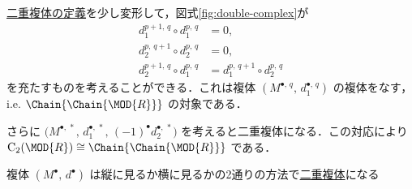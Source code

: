 \documentclass[algtopo_main]{subfiles}
\begin{document}
\begin{marker}
    \hyperref[def:double-complex]{二重複体の定義}を少し変形して，図式\ref{fig:double-complex}が
    \begin{align}
        d_1^{p+1,\, q} \circ d_1^{p,\, q} &= 0, \\
        d_2^{p,\, q+1} \circ d_2^{p,\, q} &= 0, \\
        d_2^{p+1,\, q} \circ d_1^{p,\, q} &= d_1^{p,\, q+1} \circ d_2^{p,\, q}
    \end{align}
    を充たすものを考えることができる．これは複体 $(M^{\bullet,\, q},\, d_1^{\bullet,\, q})$ の複体をなす，i.e. $\Chain{\Chain{\MOD{R}}}$ の対象である．

    さらに $\bigl( M^{\bullet,\, *},\, d_1^{\bullet,\, *},\, (-1)^\bullet d_2^{\bullet,\, *} \bigr)$ を考えると二重複体になる．この対応により $\mathrm{C}_2(\MOD{R}) \cong \Chain{\Chain{\MOD{R}}}$ である．
\end{marker}

複体 $(M^\bullet,\, d^\bullet)$ は縦に見るか横に見るかの2通りの方法で\hyperref[def:double-complex]{二重複体}になる
\end{document}
